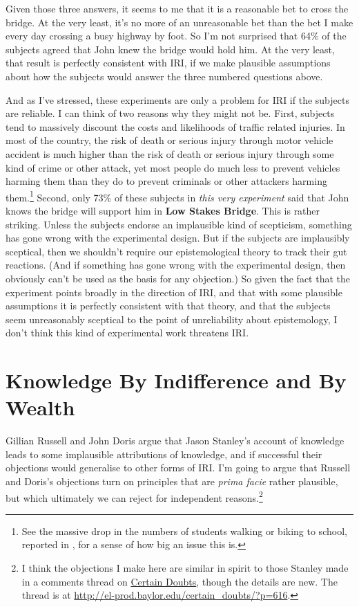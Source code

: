 Given those three answers, it seems to me that it is a reasonable bet to cross the bridge. At the very least, it's no more of an unreasonable bet than the bet I make every day crossing a busy highway by foot. So I'm not surprised that 64\% of the subjects agreed that John knew the bridge would hold him. At the very least, that result is perfectly consistent with IRI, if we make plausible assumptions about how the subjects would answer the three numbered questions above.

And as I've stressed, these experiments are only a problem for IRI if the subjects are reliable. I can think of two reasons why they might not be. First, subjects tend to massively discount the costs and likelihoods of traffic related injuries. In most of the country, the risk of death or serious injury through motor vehicle accident is much higher than the risk of death or serious injury through some kind of crime or other attack, yet most people do much less to prevent vehicles harming them than they do to prevent criminals or other attackers harming them.\footnote{See the massive drop in the numbers of students walking or biking to school, reported in \citet{Ham2008}, for a sense of how big an issue this is.} Second, only 73\% of these subjects in \textit{this very experiment} said that John knows the bridge will support him in \textbf{Low Stakes Bridge}. This is rather striking. Unless the subjects endorse an implausible kind of scepticism, something has gone wrong with the experimental design. But if the subjects are implausibly sceptical, then we shouldn't require our epistemological theory to track their gut reactions. (And if something has gone wrong with the experimental design, then obviously can't be used as the basis for any objection.) So given the fact that the experiment points broadly in the direction of IRI, and that with some plausible assumptions it is perfectly consistent with that theory, and that the subjects seem unreasonably sceptical to the point of unreliability about epistemology, I don't think this kind of experimental work threatens IRI.

\section{Knowledge By Indifference and By Wealth}

Gillian Russell and John Doris \citeyearpar{RussellDoris2008} argue that Jason Stanley's account of knowledge leads to some implausible attributions of knowledge, and if successful their objections would generalise to other forms of IRI. I'm going to argue that Russell and Doris's objections turn on principles that are \textit{prima facie} rather plausible, but which ultimately we can reject for independent reasons.\footnote{I think the objections I make here are similar in spirit to those Stanley made in a comments thread on \href{http://el-prod.baylor.edu/certain_doubts/?p=616}{Certain Doubts}, though the details are new. The thread is at \href{http://el-prod.baylor.edu/certain_doubts/?p=616}{http://el-prod.baylor.edu/certain\_doubts/?p=616}.}

